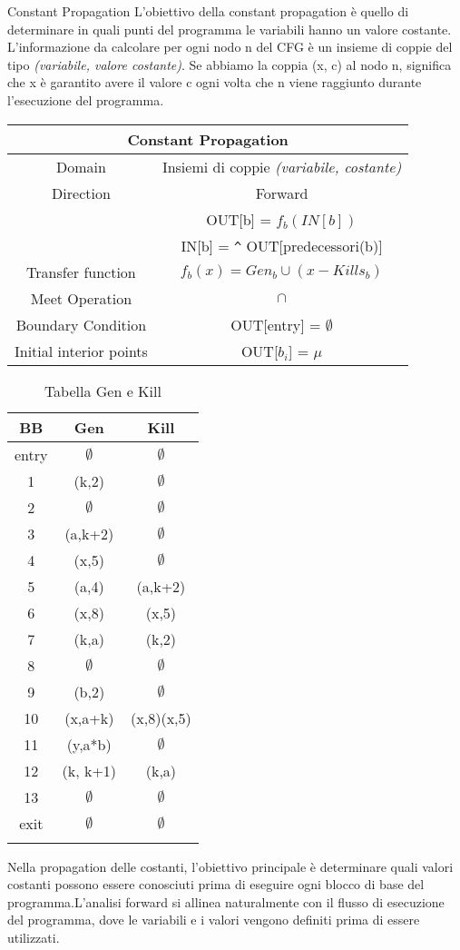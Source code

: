 \documentclass{article}
\begin{document}
\begin{section}{Constant Propagation}
	L’obiettivo della constant propagation è quello di determinare in quali punti del programma le variabili hanno un valore costante. 
	\\
	L’informazione da calcolare per ogni nodo n del CFG è un insieme di coppie del tipo \textit{(variabile, valore costante)}. Se abbiamo la coppia (x, c) al nodo n, significa che x è garantito avere il valore c ogni volta che n viene raggiunto
	durante l’esecuzione del programma.
	
	
\begin{longtable}{| c | c |}
	\hline
	\multicolumn{2}{|c|}{\textbf{Constant Propagation}} \\
	\hline
	Domain & Insiemi di coppie \textit{(variabile, costante)} \\
	\hline
	Direction & Forward \\
	& OUT[b] = $f_b (IN[b])$ \\
	& IN[b] = \verb*|^| OUT[predecessori(b)] \\
	\hline
	Transfer function &  $f_b(x) = Gen_b \cup (x - Kills_b)$\\
	\hline
	Meet Operation & $\cap$ \\
	\hline
	Boundary Condition & OUT[entry] = $\emptyset$ \\
	\hline
	Initial interior points & OUT[$b_i$] = $\mu$ \\
	\hline
\end{longtable}

	
\begin{longtable}{| c | c | c |}
	\hline
	\textbf{BB} & \textbf{Gen} & \textbf{Kill}\\
	\hline
	entry & $\emptyset$ & $\emptyset$\\
	1 & (k,2) & $\emptyset$\\
	2 & $\emptyset$&$\emptyset$\\
	3 & (a,k+2) & $\emptyset$\\
	4 & (x,5)&$\emptyset$ \\
	5 & (a,4)&(a,k+2)\\
	6 & (x,8)& (x,5)\\
	7 & (k,a)&(k,2)\\
	8 & $\emptyset$&$\emptyset$\\
	9 & (b,2)& $\emptyset$\\
	10 & (x,a+k)& (x,8)(x,5)\\
	11 & (y,a*b)& $\emptyset$\\
	12 & (k, k+1) & (k,a)\\
	13 & $\emptyset$ & $\emptyset$\\
	exit & $\emptyset$ & $\emptyset$ \\
	\hline
	\caption{Tabella Gen e Kill}\\
\end{longtable}	
 Nella propagation delle costanti, l'obiettivo principale è determinare quali valori costanti possono essere conosciuti prima di eseguire ogni blocco di base del programma.L'analisi forward si allinea naturalmente con il flusso di esecuzione del programma, dove le variabili e i valori vengono definiti prima di essere utilizzati.
 

\end{section}
\end{document}
